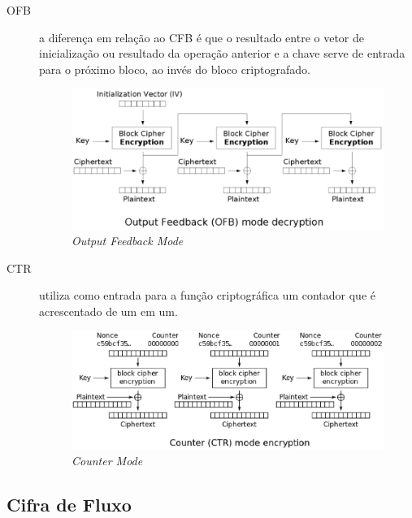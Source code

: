 \begin{description}
\item[OFB] a diferença em relação ao CFB é que o resultado entre o vetor de inicialização ou resultado da operação anterior e a chave serve de entrada para o próximo bloco, ao invés do bloco criptografado.
\begin{figure}[h]
\centering
\includegraphics[keepaspectratio=true,scale=0.7]
    {figuras/ofb.eps}
    \caption[\textit{Output Feedback Mode}]{\textit{Output Feedback Mode}\protect\footnotemark} 
\end{figure}
\item[CTR] utiliza como entrada para a função criptográfica um contador que é acrescentado de um em um. 
\begin{figure}[h]
\centering
\includegraphics[keepaspectratio=true,scale=0.5]
    {figuras/ctr.eps}
    \caption[\textit{Counter Mode}]{\textit{Counter Mode}\protect\footnotemark} 
\end{figure}
\end{description}

\subsection{Cifra de Fluxo}
\label{stream-cipher}

